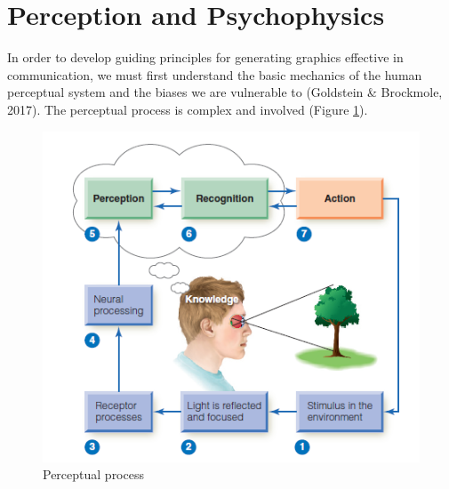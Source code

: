\documentclass[print]{nuthesis}
\begin{document}
\hypertarget{perception-and-psychophysics}{%
\section{Perception and Psychophysics}\label{perception-and-psychophysics}}

In order to develop guiding principles for generating graphics effective in communication, we must first understand the basic mechanics of the human perceptual system and the biases we are vulnerable to (Goldstein \& Brockmole, 2017).
The perceptual process is complex and involved (Figure \ref{fig:perceptual-process}).

\begin{figure}

{\centering \includegraphics[width=0.75\linewidth]{images/perceptual-process-goldsein-pg5} 

}

\caption{Perceptual process}\label{fig:perceptual-process}
\end{figure}
\end{document}
